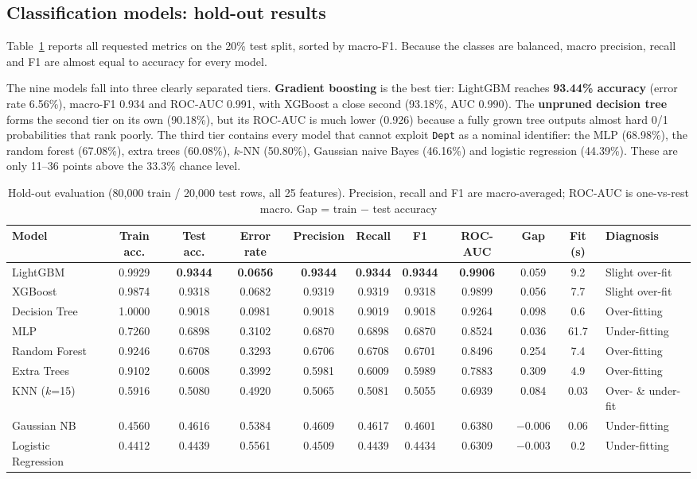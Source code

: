 \subsection{Classification models: hold-out results}\label{sec:res:models}
Table~\ref{tab:hold} reports all requested metrics on the 20\% test split, sorted by macro-F1. Because the classes are balanced, macro precision, recall and F1 are almost equal to accuracy for every model.

The nine models fall into three clearly separated tiers. \textbf{Gradient boosting} is the best tier: LightGBM reaches \textbf{93.44\% accuracy} (error rate 6.56\%), macro-F1 0.934 and ROC-AUC 0.991, with XGBoost a close second (93.18\%, AUC 0.990). The \textbf{unpruned decision tree} forms the second tier on its own (90.18\%), but its ROC-AUC is much lower (0.926) because a fully grown tree outputs almost hard 0/1 probabilities that rank poorly. The third tier contains every model that cannot exploit \texttt{Dept} as a nominal identifier: the MLP (68.98\%), the random forest (67.08\%), extra trees (60.08\%), $k$-NN (50.80\%), Gaussian naive Bayes (46.16\%) and logistic regression (44.39\%). These are only 11--36 points above the 33.3\% chance level.

\begin{table}[!t]
\caption{Hold-out evaluation (80{,}000 train / 20{,}000 test rows, all 25 features). Precision, recall and F1 are macro-averaged; ROC-AUC is one-vs-rest macro. Gap = train $-$ test accuracy}
\label{tab:hold}
\centering
\begin{tabular}{lcccccccccl}
\toprule
Model & Train acc. & Test acc. & Error rate & Precision & Recall & F1 & ROC-AUC & Gap & Fit (s) & Diagnosis \\
\midrule
LightGBM & 0.9929 & \textbf{0.9344} & \textbf{0.0656} & \textbf{0.9344} & \textbf{0.9344} & \textbf{0.9344} & \textbf{0.9906} & 0.059 & 9.2 & Slight over-fit \\
XGBoost & 0.9874 & 0.9318 & 0.0682 & 0.9319 & 0.9319 & 0.9318 & 0.9899 & 0.056 & 7.7 & Slight over-fit \\
Decision Tree & 1.0000 & 0.9018 & 0.0981 & 0.9018 & 0.9019 & 0.9018 & 0.9264 & 0.098 & 0.6 & Over-fitting \\
MLP & 0.7260 & 0.6898 & 0.3102 & 0.6870 & 0.6898 & 0.6870 & 0.8524 & 0.036 & 61.7 & Under-fitting \\
Random Forest & 0.9246 & 0.6708 & 0.3293 & 0.6706 & 0.6708 & 0.6701 & 0.8496 & 0.254 & 7.4 & Over-fitting \\
Extra Trees & 0.9102 & 0.6008 & 0.3992 & 0.5981 & 0.6009 & 0.5989 & 0.7883 & 0.309 & 4.9 & Over-fitting \\
KNN ($k$=15) & 0.5916 & 0.5080 & 0.4920 & 0.5065 & 0.5081 & 0.5055 & 0.6939 & 0.084 & 0.03 & Over- \& under-fit \\
Gaussian NB & 0.4560 & 0.4616 & 0.5384 & 0.4609 & 0.4617 & 0.4601 & 0.6380 & $-0.006$ & 0.06 & Under-fitting \\
Logistic Regression & 0.4412 & 0.4439 & 0.5561 & 0.4509 & 0.4439 & 0.4434 & 0.6309 & $-0.003$ & 0.2 & Under-fitting \\
\bottomrule
\end{tabular}
\end{table}

